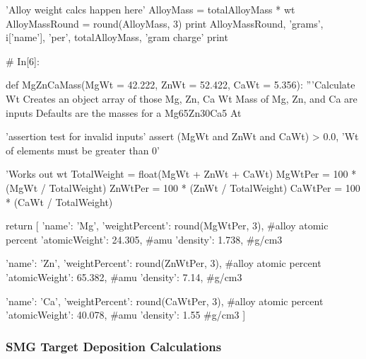 \documentclass[a4paper,8pt]{article}
\begin{document}
\begin{python}
'Alloy weight calcs happen here'
AlloyMass = totalAlloyMass * wt
AlloyMassRound = round(AlloyMass, 3) 
print AlloyMassRound, 'grams', i['name'], 'per', totalAlloyMass, 'gram charge'
print 


# In[6]:

def MgZnCaMass(MgWt = 42.222, ZnWt = 52.422, CaWt = 5.356):
'''Calculate Wt%
Creates an object array of those Mg, Zn, Ca Wt%
Mass of Mg, Zn, and Ca are inputs
Defaults are the masses for a Mg65Zn30Ca5 At%

'assertion test for invalid inputs'
assert (MgWt and ZnWt and CaWt) > 0.0, 'Wt of elements must be greater than 0'

'Works out wt%
TotalWeight = float(MgWt + ZnWt + CaWt)
MgWtPer = 100 * (MgWt / TotalWeight)
ZnWtPer = 100 * (ZnWt / TotalWeight)
CaWtPer = 100 * (CaWt / TotalWeight)

return [
{'name': 'Mg', 
	'weightPercent': round(MgWtPer, 3), #alloy atomic percent
	'atomicWeight': 24.305, #amu
	'density': 1.738}, #g/cm3

{'name': 'Zn', 
	'weightPercent': round(ZnWtPer, 3), #alloy atomic percent
	'atomicWeight': 65.382, #amu
	'density': 7.14}, #g/cm3

{'name': 'Ca', 
	'weightPercent': round(CaWtPer, 3), #alloy atomic percent
	'atomicWeight': 40.078, #amu
	'density': 1.55} #g/cm3
]
\end{python}


\subsubsection{SMG Target Deposition Calculations}
\end{document}

